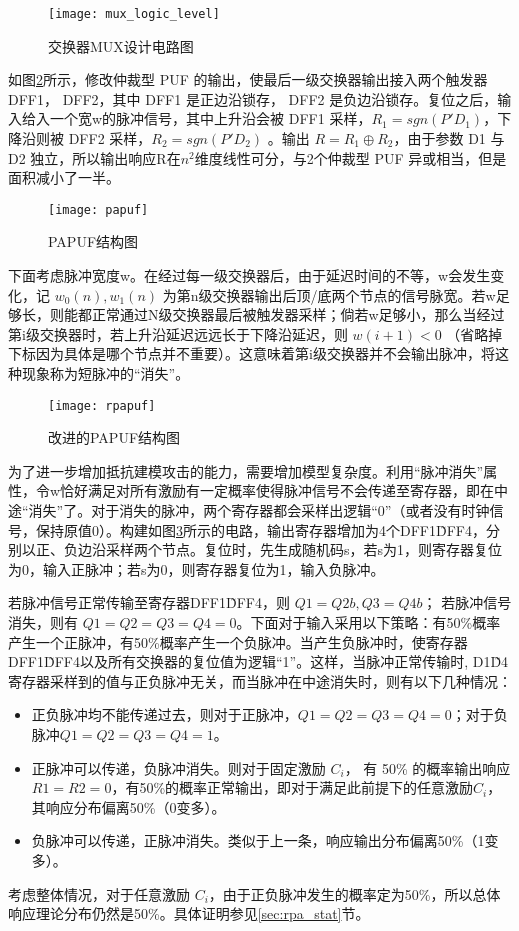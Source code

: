 \begin{figure}[htb]
\centering
\texttt{[image: mux\_logic\_level]}
\caption{交换器MUX设计电路图}
\label{fig:mux_logic}
\end{figure}

如图\ref{fig:papuf}所示，修改仲裁型 PUF 的输出，使最后一级交换器输出接入两个触发器 DFF1， DFF2，其中 DFF1 是正边沿锁存， DFF2 是负边沿锁存。复位之后，输入给入一个宽w的脉冲信号，其中上升沿会被 DFF1 采样，$ R_1=sgn(P'D_1 ) $，下降沿则被 DFF2 采样，$ R_2=sgn(P'D_2 ) $ 。输出 $ R=R_1\oplus R_2 $，由于参数 D1 与 D2 独立，所以输出响应R在$ n^2 $维度线性可分，与2个仲裁型 PUF 异或相当，但是面积减小了一半。

\begin{figure}[htb]
\centering
\texttt{[image: papuf]}
\caption{PAPUF结构图}
\label{fig:papuf}
\end{figure}

下面考虑脉冲宽度w。在经过每一级交换器后，由于延迟时间的不等，w会发生变化，记 $ w_0 (n),w_1 (n) $ 为第n级交换器输出后顶/底两个节点的信号脉宽。若w足够长，则能都正常通过N级交换器最后被触发器采样；倘若w足够小，那么当经过第i级交换器时，若上升沿延迟远远长于下降沿延迟，则 $ w(i+1)<0 $ （省略掉下标因为具体是哪个节点并不重要）。这意味着第i级交换器并不会输出脉冲，将这种现象称为短脉冲的``消失''。

\begin{figure}[htb]
\centering
\texttt{[image: rpapuf]}
\caption{改进的PAPUF结构图}
\label{fig:rpapuf}
\end{figure}

为了进一步增加抵抗建模攻击的能力，需要增加模型复杂度。利用``脉冲消失''属性，令w恰好满足对所有激励有一定概率使得脉冲信号不会传递至寄存器，即在中途``消失''了。对于消失的脉冲，两个寄存器都会采样出逻辑``0''（或者没有时钟信号，保持原值0）。构建如图\ref{fig:rpapuf}所示的电路，输出寄存器增加为4个DFF1\~DFF4，分别以正、负边沿采样两个节点。复位时，先生成随机码s，若s为1，则寄存器复位为0，输入正脉冲；若s为0，则寄存器复位为1，输入负脉冲。

若脉冲信号正常传输至寄存器DFF1\~DFF4，则 $ Q1=Q2b, Q3=Q4b $； 若脉冲信号消失，则有 $ Q1=Q2=Q3=Q4=0 $。下面对于输入采用以下策略：有50\%概率产生一个正脉冲，有50\%概率产生一个负脉冲。当产生负脉冲时，使寄存器DFF1\~DFF4以及所有交换器的复位值为逻辑``1''。这样，当脉冲正常传输时, D1\~D4 寄存器采样到的值与正负脉冲无关，而当脉冲在中途消失时，则有以下几种情况：

\begin{itemize}
\item 正负脉冲均不能传递过去，则对于正脉冲，$ Q1=Q2=Q3=Q4=0 $；对于负脉冲$ Q1=Q2=Q3=Q4=1 $。
\item 正脉冲可以传递，负脉冲消失。则对于固定激励 $ C_i $， 有 50\% 的概率输出响应 $ R1=R2=0 $，有50\%的概率正常输出，即对于满足此前提下的任意激励$ C_i $，其响应分布偏离50\%（0变多）。
\item 负脉冲可以传递，正脉冲消失。类似于上一条，响应输出分布偏离50\%（1变多）。
\end{itemize}
考虑整体情况，对于任意激励 $ C_i $，由于正负脉冲发生的概率定为50\%，所以总体响应理论分布仍然是50\%。具体证明参见\ref{sec:rpa_stat}节。

